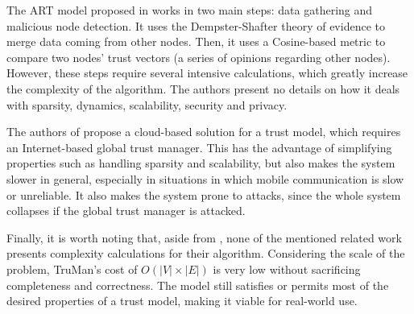 \documentclass[conference]{IEEEtran}
\begin{document}
The ART model proposed in \cite{li2016art} works in two main steps: data gathering and malicious node detection.
It uses the Dempster-Shafter theory of evidence to merge data coming from other nodes.
Then, it uses a Cosine-based metric to compare two nodes' trust vectors (a series of opinions regarding other nodes).
However, these steps require several intensive calculations, which greatly increase the complexity of the algorithm.
The authors present no details on how it deals with sparsity, dynamics, scalability, security and privacy.

The authors of \cite{chen2017cloud} propose a cloud-based solution for a trust model, which requires an Internet-based global trust manager.
This has the advantage of simplifying properties such as handling sparsity and scalability, but also makes the system slower in general, especially in situations in which mobile communication is slow or unreliable.
It also makes the system prone to attacks, since the whole system collapses if the global trust manager is attacked.

Finally, it is worth noting that, aside from \cite{vernize2015malicious}, none of the mentioned related work presents complexity calculations for their algorithm.
Considering the scale of the problem, TruMan's cost of $O(|V|\times |E|)$ is very low without sacrificing completeness and correctness.
The model still satisfies or permits most of the desired properties of a trust model, making it viable for real-world use.

%
\end{document}
